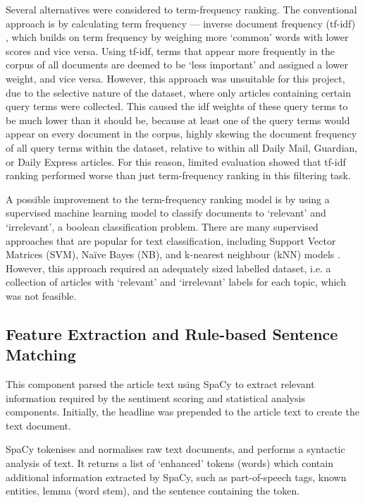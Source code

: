 \documentclass{report}
\begin{document}
Several alternatives were considered to term-frequency ranking.
The conventional approach is by calculating term frequency --- inverse document frequency (tf-idf) \cite{robertson2004understanding, sparck1972statistical}, which builds on term frequency by weighing more `common' words with lower scores and vice versa.
Using tf-idf, terms that appear more frequently in the corpus of all documents are deemed to be `less important' and assigned a lower weight, and vice versa.
However, this approach was unsuitable for this project, due to the selective nature of the dataset, where only articles containing certain query terms were collected. 
This caused the idf weights of these query terms to be much lower than it should be, because at least one of the query terms would appear on every document in the corpus, highly skewing the document frequency of all query terms within the dataset, relative to within all Daily Mail, Guardian, or Daily Express articles.
For this reason, limited evaluation showed that tf-idf ranking performed worse than just term-frequency ranking in this filtering task.

A possible improvement to the term-frequency ranking model is by using a supervised machine learning model to classify documents to `relevant' and `irrelevant', a boolean classification problem.
There are many supervised approaches that are popular for text classification, including Support Vector Matrices (SVM), Na\"{i}ve Bayes (NB), and k-nearest neighbour (kNN) models \cite{khan2010review}.
However, this approach required an adequately sized labelled dataset, i.e. a collection of articles with `relevant' and `irrelevant' labels for each topic, which was not feasible.

\subsection{Feature Extraction and Rule-based Sentence Matching} \label{des-matching}

This component parsed the article text using SpaCy \cite{SpaCy} to extract relevant information required by the sentiment scoring and statistical analysis components.
Initially, the headline was prepended to the article text to create the text document.

SpaCy tokenises and normalises raw text documents, and performs a syntactic analysis of text. 
It returns a list of `enhanced' tokens (words) which contain additional information extracted by SpaCy, such as part-of-speech tags, known entities, lemma (word stem), and the sentence containing the token.
\end{document}
